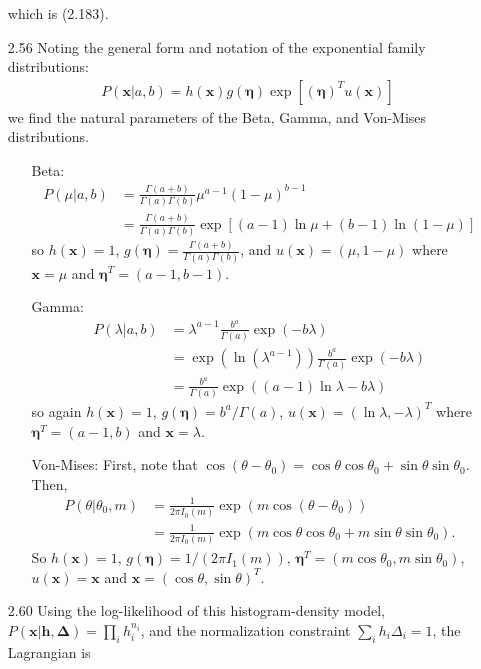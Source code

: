 \documentclass[]{article}
\begin{document}
\begin{enumerate}
	which is (2.183).
	\item[2.56] Noting the general form and notation of the exponential family distributions:
	\begin{align*}
	P(\mathbf{x} | a,b) = h(\mathbf{x})g(\bm{\eta}) \exp \left[(\bm{\eta})^T u(\mathbf{x})\right]
	\end{align*}
	we find the natural parameters of the Beta, Gamma, and Von-Mises distributions.
	\begin{itemize}
		\item[Beta:]
		\begin{align*}
		P(\mu | a,b) &= \frac{\Gamma(a + b)}{\Gamma(a)\Gamma(b)}\mu^{a-1}(1 - \mu)^{b-1} \\
		&= \frac{\Gamma(a + b)}{\Gamma(a)\Gamma(b)} \exp \left[ (a-1) \ln \mu + (b-1) \ln (1-\mu) \right]
		\end{align*}
		so $h(\mathbf{x})=1$, $g(\bm{\eta})=\frac{\Gamma(a + b)}{\Gamma(a)\Gamma(b)}$, and $u(\mathbf{x})=(\mu, 1-\mu)$ where $\mathbf{x}=\mu$ and $\bm{\eta}^T=(a-1,b-1)$.
		\item[Gamma:]
		\begin{align*}
		P(\lambda | a,b) &= \lambda^{a-1}\frac{b^{a}}{\Gamma(a)}\exp(-b\lambda) \\
		&= \exp(\ln(\lambda^{a-1}))\frac{b^a}{\Gamma(a)}\exp(-b\lambda) \\
		&= \frac{b^a}{\Gamma(a)} \exp((a-1)\ln \lambda - b\lambda)
		\end{align*}
		so again $h(\mathbf{x})=1$, $g(\bm{\eta})=b^a/\Gamma(a)$, $u(\mathbf{x})=(\ln \lambda, -\lambda)^T$ where $\bm{\eta}^T=(a-1, b)$ and $\mathbf{x}=\lambda$.
		\item[Von-Mises:]
		First, note that $\cos(\theta - \theta_0)=\cos \theta \cos \theta_0 + \sin \theta \sin \theta_0$. Then,
		\begin{align*}
		P(\theta | \theta_0, m) &= \frac{1}{2 \pi I_0(m)}\exp(m \cos(\theta - \theta_0)) \\
		&=\frac{1}{2 \pi I_0(m)}\exp\left( m\cos \theta \cos \theta_0 + m\sin \theta \sin \theta_0 \right).
		\end{align*}
		So $h(\mathbf{x})=1$, $g(\bm{\eta})=1/(2 \pi I_1(m))$, $\bm{\eta}^T=(m \cos \theta_0, m \sin \theta_0)$, $u(\mathbf{x})=\mathbf{x}$ and $\mathbf{x} = (\cos \theta, \sin \theta)^T$.
	\end{itemize}
	\item[2.60] Using the log-likelihood of this histogram-density model, $P(\mathbf{x}| \mathbf{h}, \bm{\Delta}) = \prod_{i}h_i^{n_i}$, and the normalization constraint $\sum_{i}h_i \Delta_i=1$, the Lagrangian is

\end{enumerate}
\end{document}
